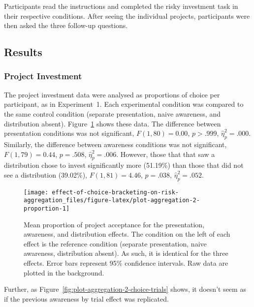 \documentclass[
  english,
  man, donotrepeattitle,floatsintext]{apa7}
\theoremstyle{definition}
\theoremstyle{definition}
\theoremstyle{definition}
\theoremstyle{definition}
\theoremstyle{remark}
\begin{document}
Participants read the instructions and completed the risky investment task in
their respective conditions. After seeing the individual projects, participants
were then asked the three follow-up questions.

\hypertarget{results-aggregation-2}{%
\subsection{Results}\label{results-aggregation-2}}

\hypertarget{project-investment}{%
\subsubsection{Project Investment}\label{project-investment}}

The project investment data were analysed as proportions of choice per
participant, as in Experiment~1. Each experimental condition was compared to the
same control condition (separate presentation, naive awareness, and distribution
absent). Figure~\ref{fig:plot-aggregation-2-proportion} shows these data. The
difference between presentation conditions was not significant,
\(F(1, 80) = 0.00\), \(p > .999\), \(\hat{\eta}^2_p = .000\). Similarly, the
difference between awareness conditions was not significant,
\(F(1, 79) = 0.44\), \(p = .508\), \(\hat{\eta}^2_p = .006\). However, those that that saw a
distribution chose to invest significantly more
(51.19\%) than those that did
not see a distribution
(39.02\%),
\(F(1, 81) = 4.46\), \(p = .038\), \(\hat{\eta}^2_p = .052\).



\begin{figure}
\texttt{[image: effect-of-choice-bracketing-on-risk-aggregation\_files/figure-latex/plot-aggregation-2-proportion-1]} \caption{Mean proportion of project acceptance for the presentation, awareness, and distribution effects. The condition on the left of each effect is the reference condition (separate presentation, naive awareness, distribution absent). As such, it is identical for the three effects. Error bars represent 95\% confidence intervals. Raw data are plotted in the background.}\label{fig:plot-aggregation-2-proportion}
\end{figure}

Further, as Figure~\ref{fig:plot-aggregation-2-choice-trials} shows, it
doesn't seem as if the previous awareness by trial effect was replicated.
\end{document}
